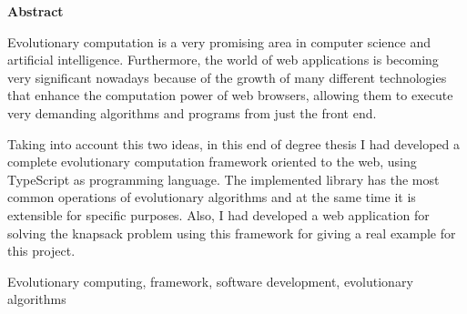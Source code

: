 \documentclass[spanish,a4paper,12pt,oneside]{extreport}
\newenvironment{summary}
{\par\noindent\begin{center}\textbf{Abstract}\end{center}\begin{itshape}\par\noindent}
{\end{itshape}}
\newenvironment{keywords}
{\begin{list}{}{\setlength{\leftmargin}{1em}}\item[\hskip\labelsep \bfseries Keywords:]}
{\end{list}}
\begin{document}
\newpage  %
\begin{summary}
{\em

Evolutionary computation is a very promising area in computer science and artificial intelligence. Furthermore, the world of web applications is becoming very significant nowadays because of the growth of many different technologies that enhance the computation power of web browsers, allowing them to execute very demanding algorithms and programs from just the front end.

\bigskip

Taking into account this two ideas, in this end of degree thesis I had developed a complete evolutionary computation framework oriented to the web, using TypeScript as programming language. The implemented library has the most common operations of evolutionary algorithms and at the same time it is extensible for specific purposes. Also, I had developed a web application for solving the knapsack problem using this framework for giving a real example for this project.
}

\begin{keywords}
Evolutionary computing, framework, software development, evolutionary algorithms
\end{keywords}

\end{summary}

\newpage{\pagestyle{empty}}
\thispagestyle{empty}



\pagestyle{myheadings} %

\renewcommand{\thepage}{\roman{page}}
\setcounter{page}{1}


\tableofcontents
\end{document}

